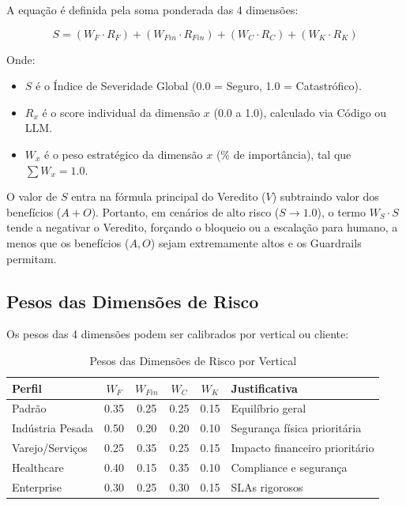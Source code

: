 \documentclass[12pt, a4paper]{article}
\begin{document}
A equação é definida pela soma ponderada das 4 dimensões:

\begin{equation}
S = (W_F \cdot R_F) + (W_{Fin} \cdot R_{Fin}) + (W_C \cdot R_C) + (W_K \cdot R_K)
\end{equation}

Onde:
\begin{itemize}
    \item \textbf{$S$} é o Índice de Severidade Global (0.0 = Seguro, 1.0 = Catastrófico).
    \item \textbf{$R_x$} é o score individual da dimensão $x$ (0.0 a 1.0), calculado via Código ou LLM.
    \item \textbf{$W_x$} é o peso estratégico da dimensão $x$ (\% de importância), tal que $\sum W_x = 1.0$.
\end{itemize}

O valor de $S$ entra na fórmula principal do Veredito ($V$) subtraindo valor dos benefícios ($A + O$). Portanto, em cenários de alto risco ($S \to 1.0$), o termo $W_S \cdot S$ tende a negativar o Veredito, forçando o bloqueio ou a escalação para humano, a menos que os benefícios ($A, O$) sejam extremamente altos e os Guardrails permitam.
\subsection{Pesos das Dimensões de Risco}

Os pesos das 4 dimensões podem ser calibrados por vertical ou cliente:

\begin{table}[h!]
\centering
\begin{tabular}{|l|c|c|c|c|l|}
\hline
\textbf{Perfil} & $W_F$ & $W_{Fin}$ & $W_C$ & $W_K$ & \textbf{Justificativa} \\ \hline
Padrão & 0.35 & 0.25 & 0.25 & 0.15 & Equilíbrio geral \\ \hline
Indústria Pesada & 0.50 & 0.20 & 0.20 & 0.10 & Segurança física prioritária \\ \hline
Varejo/Serviços & 0.25 & 0.35 & 0.25 & 0.15 & Impacto financeiro prioritário \\ \hline
Healthcare & 0.40 & 0.15 & 0.35 & 0.10 & Compliance e segurança \\ \hline
Enterprise & 0.30 & 0.25 & 0.30 & 0.15 & SLAs rigorosos \\ \hline
\end{tabular}
\caption{Pesos das Dimensões de Risco por Vertical}
\label{tab:risk_weights}
\end{table}
\end{document}
